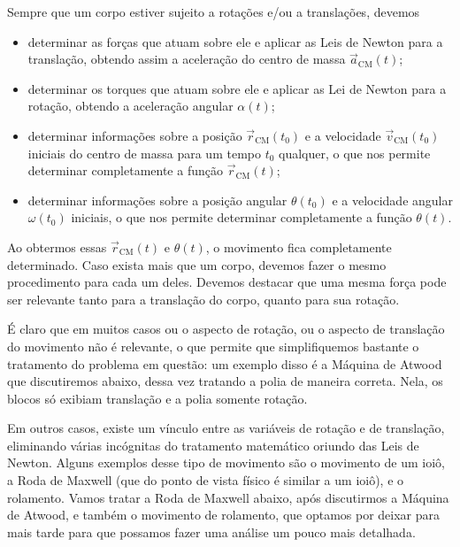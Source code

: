 Sempre que um corpo estiver sujeito a rotações e/ou a translações, devemos
\begin{itemize}
    \item determinar as forças que atuam sobre ele e aplicar as Leis de Newton para a translação, obtendo assim a aceleração do centro de massa $\vec{a}_{\text{CM}}(t)$;
    \item determinar os torques que atuam sobre ele e aplicar as Lei de Newton para a rotação, obtendo a aceleração angular $\alpha(t)$;
    \item determinar informações sobre a posição $\vec{r}_{\text{CM}}(t_0)$ e a velocidade $\vec{v}_{\text{CM}}(t_0)$ iniciais do centro de massa para um tempo $t_0$ qualquer, o que nos permite determinar completamente a função $\vec{r}_{\text{CM}}(t)$;
    \item determinar informações sobre a posição angular $\theta(t_0)$ e a velocidade angular $\omega(t_0)$ iniciais, o que nos permite determinar completamente a função $\theta(t)$.
\end{itemize}
%
Ao obtermos essas $\vec{r}_{\text{CM}}(t)$ e $\theta(t)$, o movimento fica completamente determinado. Caso exista mais que um corpo, devemos fazer o mesmo procedimento para cada um deles. Devemos destacar que uma mesma força pode ser relevante tanto para a translação do corpo, quanto para sua rotação.

É claro que em muitos casos ou o aspecto de rotação, ou o aspecto de translação do movimento não é relevante, o que permite que simplifiquemos bastante o tratamento do problema em questão: um exemplo disso é a Máquina de Atwood que discutiremos abaixo, dessa vez tratando a polia de maneira correta. Nela, os blocos só exibiam translação e a polia somente rotação.

Em outros casos, existe um vínculo entre as variáveis de rotação e de translação, eliminando várias incógnitas do tratamento matemático oriundo das Leis de Newton. Alguns exemplos desse tipo de movimento são o movimento de um ioiô, a Roda de Maxwell (que do ponto de vista físico é similar a um ioiô), e o rolamento. Vamos tratar a Roda de Maxwell abaixo, após discutirmos a Máquina de Atwood, e também o movimento de rolamento, que optamos por deixar para mais tarde para que possamos fazer uma análise um pouco mais detalhada.

